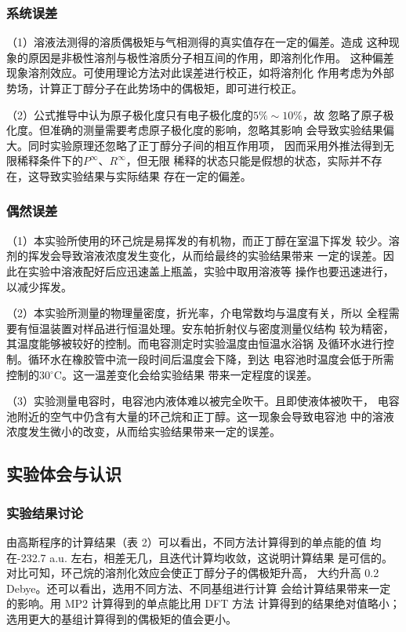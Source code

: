 \documentclass[12pt]{ctexart}
\numberwithin{equation}{section}
\begin{document}
\subsubsection{系统误差}

（1）溶液法测得的溶质偶极矩与气相测得的真实值存在一定的偏差。造成
这种现象的原因是非极性溶剂与极性溶质分子相互间的作用，即溶剂化作用。
这种偏差现象溶剂效应。可使用理论方法对此误差进行校正，如将溶剂化
作用考虑为外部势场，计算正丁醇分子在此势场中的偶极矩，即可进行校正。

（2）公式推导中认为原子极化度只有电子极化度的$5\%\sim 10\%$，故
忽略了原子极化度。但准确的测量需要考虑原子极化度的影响，忽略其影响
会导致实验结果偏大。同时实验原理还忽略了正丁醇分子间的相互作用项，
因而采用外推法得到无限稀释条件下的$P^\infty$、$R^\infty$，但无限
稀释的状态只能是假想的状态，实际并不存在，这导致实验结果与实际结果
存在一定的偏差。

\subsubsection{偶然误差}

（1）本实验所使用的环己烷是易挥发的有机物，而正丁醇在室温下挥发
较少。溶剂的挥发会导致溶液浓度发生变化，从而给最终的实验结果带来
一定的误差。因此在实验中溶液配好后应迅速盖上瓶盖，实验中取用溶液等
操作也要迅速进行，以减少挥发。

（2）本实验所测量的物理量密度，折光率，介电常数均与温度有关，所以
全程需要有恒温装置对样品进行恒温处理。安东帕折射仪与密度测量仪结构
较为精密，其温度能够被较好的控制。而电容测定时实验温度由恒温水浴锅
及循环水进行控制。循环水在橡胶管中流一段时间后温度会下降，到达
电容池时温度会低于所需控制的30$^\circ$C。这一温差变化会给实验结果
带来一定程度的误差。

（3）实验测量电容时，电容池内液体难以被完全吹干。且即使液体被吹干，
电容池附近的空气中仍含有大量的环己烷和正丁醇。这一现象会导致电容池
中的溶液浓度发生微小的改变，从而给实验结果带来一定的误差。

\subsection{实验体会与认识}

\subsubsection{实验结果讨论}

由高斯程序的计算结果（表 2）可以看出，不同方法计算得到的单点能的值
均在-232.7 a.u. 左右，相差无几，且迭代计算均收敛，这说明计算结果
是可信的。对比可知，环己烷的溶剂化效应会使正丁醇分子的偶极矩升高，
大约升高 0.2 Debye。还可以看出，选用不同方法、不同基组进行计算
会给计算结果带来一定的影响。用 MP2 计算得到的单点能比用 DFT 方法
计算得到的结果绝对值略小；选用更大的基组计算得到的偶极矩的值会更小。
\end{document}
